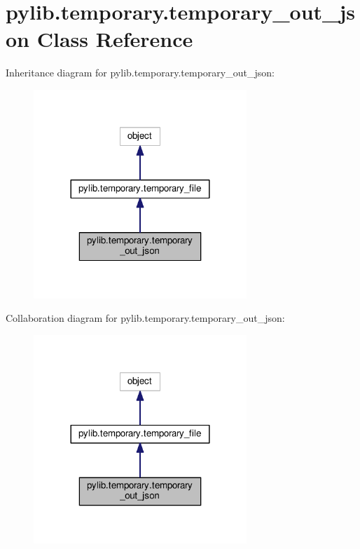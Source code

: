\hypertarget{classpylib_1_1temporary_1_1temporary__out__json}{}\section{pylib.\+temporary.\+temporary\+\_\+out\+\_\+json Class Reference}
\label{classpylib_1_1temporary_1_1temporary__out__json}


Inheritance diagram for pylib.\+temporary.\+temporary\+\_\+out\+\_\+json\+:
\nopagebreak
\begin{figure}[H]
\begin{center}
\leavevmode
\includegraphics[width=228pt]{classpylib_1_1temporary_1_1temporary__out__json__inherit__graph}
\end{center}
\end{figure}


Collaboration diagram for pylib.\+temporary.\+temporary\+\_\+out\+\_\+json\+:
\nopagebreak
\begin{figure}[H]
\begin{center}
\leavevmode
\includegraphics[width=228pt]{classpylib_1_1temporary_1_1temporary__out__json__coll__graph}
\end{center}
\end{figure}
